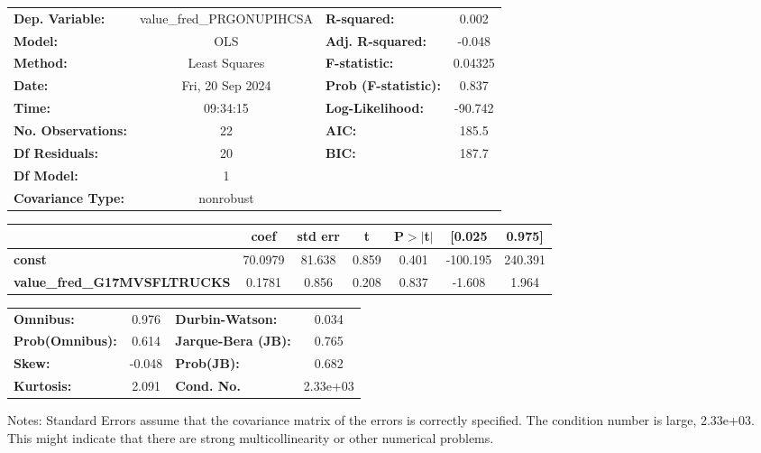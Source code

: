 \begin{center}
\begin{tabular}{lclc}
\toprule
\textbf{Dep. Variable:}              & value\_fred\_PRGONUPIHCSA & \textbf{  R-squared:         } &     0.002   \\
\textbf{Model:}                      &            OLS            & \textbf{  Adj. R-squared:    } &    -0.048   \\
\textbf{Method:}                     &       Least Squares       & \textbf{  F-statistic:       } &   0.04325   \\
\textbf{Date:}                       &      Fri, 20 Sep 2024     & \textbf{  Prob (F-statistic):} &    0.837    \\
\textbf{Time:}                       &          09:34:15         & \textbf{  Log-Likelihood:    } &   -90.742   \\
\textbf{No. Observations:}           &               22          & \textbf{  AIC:               } &     185.5   \\
\textbf{Df Residuals:}               &               20          & \textbf{  BIC:               } &     187.7   \\
\textbf{Df Model:}                   &                1          & \textbf{                     } &             \\
\textbf{Covariance Type:}            &         nonrobust         & \textbf{                     } &             \\
\bottomrule
\end{tabular}
\begin{tabular}{lcccccc}
                                     & \textbf{coef} & \textbf{std err} & \textbf{t} & \textbf{P$> |$t$|$} & \textbf{[0.025} & \textbf{0.975]}  \\
\midrule
\textbf{const}                       &      70.0979  &       81.638     &     0.859  &         0.401        &     -100.195    &      240.391     \\
\textbf{value\_fred\_G17MVSFLTRUCKS} &       0.1781  &        0.856     &     0.208  &         0.837        &       -1.608    &        1.964     \\
\bottomrule
\end{tabular}
\begin{tabular}{lclc}
\textbf{Omnibus:}       &  0.976 & \textbf{  Durbin-Watson:     } &    0.034  \\
\textbf{Prob(Omnibus):} &  0.614 & \textbf{  Jarque-Bera (JB):  } &    0.765  \\
\textbf{Skew:}          & -0.048 & \textbf{  Prob(JB):          } &    0.682  \\
\textbf{Kurtosis:}      &  2.091 & \textbf{  Cond. No.          } & 2.33e+03  \\
\bottomrule
\end{tabular}
\end{center}

Notes: \newline
 [1] Standard Errors assume that the covariance matrix of the errors is correctly specified. \newline
 [2] The condition number is large, 2.33e+03. This might indicate that there are \newline
 strong multicollinearity or other numerical problems.